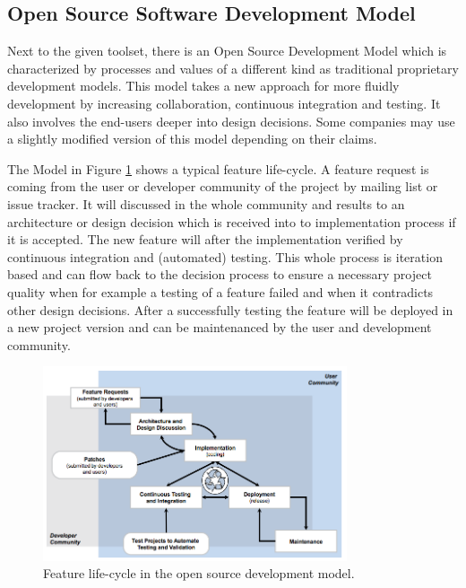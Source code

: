 \documentclass[DIV=calc,paper=a4,fontsize=9pt,twocolumn]{scrartcl}
\begin{document}
\subsection{Open Source Software Development Model}

Next to the given toolset, there is an Open Source Development Model which is characterized by processes and values of a different kind as traditional proprietary development models. This model takes a new approach for more fluidly development by increasing collaboration, continuous integration and testing. It also involves the end-users deeper into design decisions. Some companies may use a slightly modified version of this model depending on their claims. \citep{Haddad11}

The Model in Figure \ref{fig:feature-life-cycle} shows a typical feature life-cycle. A feature request is coming from the user or developer community of the project by mailing list or issue tracker. It will discussed in the whole community and results to an architecture or design decision which is received into to implementation process if it is accepted. The new feature will after the implementation verified by continuous integration and (automated) testing. This whole process is iteration based and can flow back to the decision process to ensure a necessary project quality when for example a testing of a feature failed and when it contradicts other design decisions. After a successfully testing the feature will be deployed in a new project version and can be maintenanced by the user and development community. \citep{Haddad11}

\begin{figure}[ht]
    \includegraphics[width=0.8\textwidth ]{img/feature-life-cycle.png}{}
    \centering
    \caption{Feature life-cycle in the open source development model. \citet{Haddad11}}\label{fig:feature-life-cycle}
\end{figure}
\end{document}
